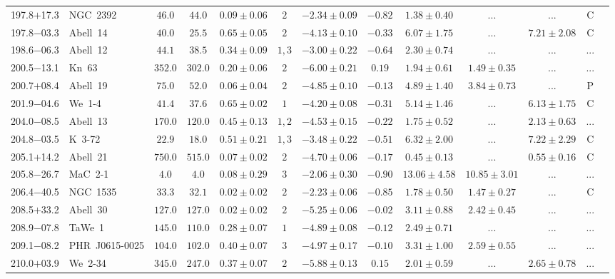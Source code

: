 \documentclass[useAMS]{mn2e}
\begin{document}
\begin{center}
{\begin{longtable}{llccccccccccc}
197.8$+$17.3&NGC~2392&$      46.0$&$      44.0$&$0.09 \pm 0.06$&$2$&$-2.34 \pm 0.09$&$     -0.82$&$1.38 \pm 0.40$&$...$&$...$&C\\
197.8$-$03.3&Abell~14&$      40.0$&$      25.5$&$0.65 \pm 0.05$&$2$&$-4.13 \pm 0.10$&$     -0.33$&$6.07 \pm 1.75$&$...$&$7.21 \pm 2.08$&C\\
198.6$-$06.3&Abell~12&$      44.1$&$      38.5$&$0.34 \pm 0.09$&$1,3$&$-3.00 \pm 0.22$&$     -0.64$&$2.30 \pm 0.74$&$...$&$...$&...\\
200.5$-$13.1&Kn~63&$     352.0$&$     302.0$&$0.20 \pm 0.06$&$2$&$-6.00 \pm 0.21$&$      0.19$&$1.94 \pm 0.61$&$1.49 \pm 0.35$&$...$&...\\
200.7$+$08.4&Abell~19&$      75.0$&$      52.0$&$0.06 \pm 0.04$&$2$&$-4.85 \pm 0.10$&$     -0.13$&$4.89 \pm 1.40$&$3.84 \pm 0.73$&$...$&P\\
201.9$-$04.6&We~1-4&$      41.4$&$      37.6$&$0.65 \pm 0.02$&$1$&$-4.20 \pm 0.08$&$     -0.31$&$5.14 \pm 1.46$&$...$&$6.13 \pm 1.75$&C\\
204.0$-$08.5&Abell~13&$     170.0$&$     120.0$&$0.45 \pm 0.13$&$1,2$&$-4.53 \pm 0.15$&$     -0.22$&$1.75 \pm 0.52$&$...$&$2.13 \pm 0.63$&...\\
204.8$-$03.5&K~3-72&$      22.9$&$      18.0$&$0.51 \pm 0.21$&$1,3$&$-3.48 \pm 0.22$&$     -0.51$&$6.32 \pm 2.00$&$...$&$7.22 \pm 2.29$&C\\
205.1$+$14.2&Abell~21&$     750.0$&$     515.0$&$0.07 \pm 0.02$&$2$&$-4.70 \pm 0.06$&$     -0.17$&$0.45 \pm 0.13$&$...$&$0.55 \pm 0.16$&C\\
205.8$-$26.7&MaC~2-1&$       4.0$&$       4.0$&$0.08 \pm 0.29$&$3$&$-2.06 \pm 0.30$&$     -0.90$&$13.06 \pm 4.58$&$10.85 \pm 3.01$&$...$&...\\
206.4$-$40.5&NGC~1535&$      33.3$&$      32.1$&$0.02 \pm 0.02$&$2$&$-2.23 \pm 0.06$&$     -0.85$&$1.78 \pm 0.50$&$1.47 \pm 0.27$&$...$&C\\
208.5$+$33.2&Abell~30&$     127.0$&$     127.0$&$0.02 \pm 0.02$&$2$&$-5.25 \pm 0.06$&$     -0.02$&$3.11 \pm 0.88$&$2.42 \pm 0.45$&$...$&...\\
208.9$-$07.8&TaWe~1&$     145.0$&$     110.0$&$0.28 \pm 0.07$&$1$&$-4.89 \pm 0.08$&$     -0.12$&$2.49 \pm 0.71$&$...$&$...$&...\\
209.1$-$08.2&PHR~J0615-0025&$     104.0$&$     102.0$&$0.40 \pm 0.07$&$3$&$-4.97 \pm 0.17$&$     -0.10$&$3.31 \pm 1.00$&$2.59 \pm 0.55$&$...$&...\\
210.0$+$03.9&We~2-34&$     345.0$&$     247.0$&$0.37 \pm 0.07$&$2$&$-5.88 \pm 0.13$&$      0.15$&$2.01 \pm 0.59$&$...$&$2.65 \pm 0.78$&...\\

\end{longtable}}
\end{center}
\end{document}

